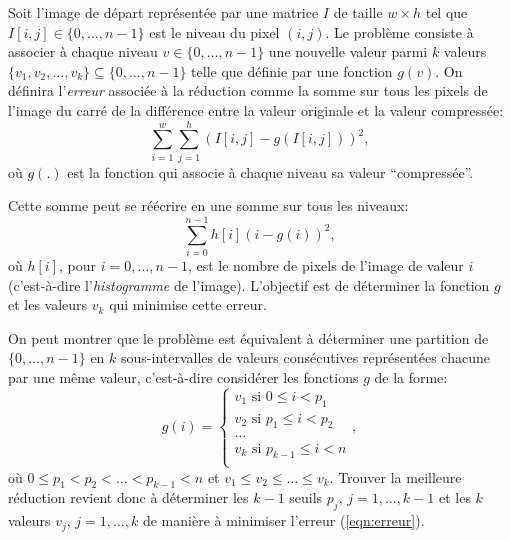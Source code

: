 \documentclass[a4paper,10pt]{article}
\begin{document}
Soit l'image de départ représentée par une matrice $I$ de taille
$w\times h$ tel que $I[i,j]\in\{0,\ldots,n-1\}$ est le niveau du pixel
$(i,j)$. Le problème consiste à associer à chaque niveau $v\in
\{0,\ldots,n-1\}$ une nouvelle valeur parmi $k$ valeurs $\{v_1,
v_2,\ldots, v_k\} \subseteq \{0,\ldots, n-1\}$ telle que définie par une
fonction $g(v)$. On définira l'{\it erreur} associée à la réduction
comme la somme sur tous les pixels de l'image du carré de la
différence entre la valeur originale et la valeur compressée:
$$\sum_{i=1}^w\sum_{j=1}^h (I[i,j]-g(I[i,j]))^2,$$ où $g(.)$ est la
fonction qui associe à chaque niveau sa valeur ``compressée''.

Cette somme peut se réécrire en une somme sur tous les niveaux:
\begin{equation}\label{eqn:erreur}
\sum_{i=0}^{n-1} h[i] (i-g(i))^2,
\end{equation}
où $h[i]$, pour $i=0,\ldots,n-1$, est le nombre de pixels de l'image
de valeur $i$ (c'est-à-dire l'{\it histogramme} de l'image). L'objectif est
de déterminer la fonction $g$ et les valeurs $v_k$ qui minimise cette
erreur.

On peut montrer que le problème est équivalent à déterminer une
partition de $\{0,\ldots,n-1\}$ en $k$ sous-intervalles de valeurs
consécutives représentées chacune par une même valeur, c'est-à-dire
considérer les fonctions $g$ de la forme:
\[
g(i)=\left\{
\begin{array}{ll}
v_1\mbox{ si }0\leq i<p_1\\
v_2\mbox{ si }p_1\leq i < p_2\\
\ldots\\
v_k\mbox{ si }p_{k-1}\leq i< n\\
\end{array}
\right.,
\]
où $0\leq p_1<p_2<\ldots<p_{k-1}<n$ et $v_1\leq v_2\leq\ldots \leq v_k$. Trouver la meilleure réduction revient
donc à déterminer les $k-1$ seuils $p_j$, $j=1,\ldots, k-1$ et les $k$
valeurs $v_j$, $j=1,\ldots,k$ de manière à minimiser l'erreur
(\ref{eqn:erreur}).
\end{document}
